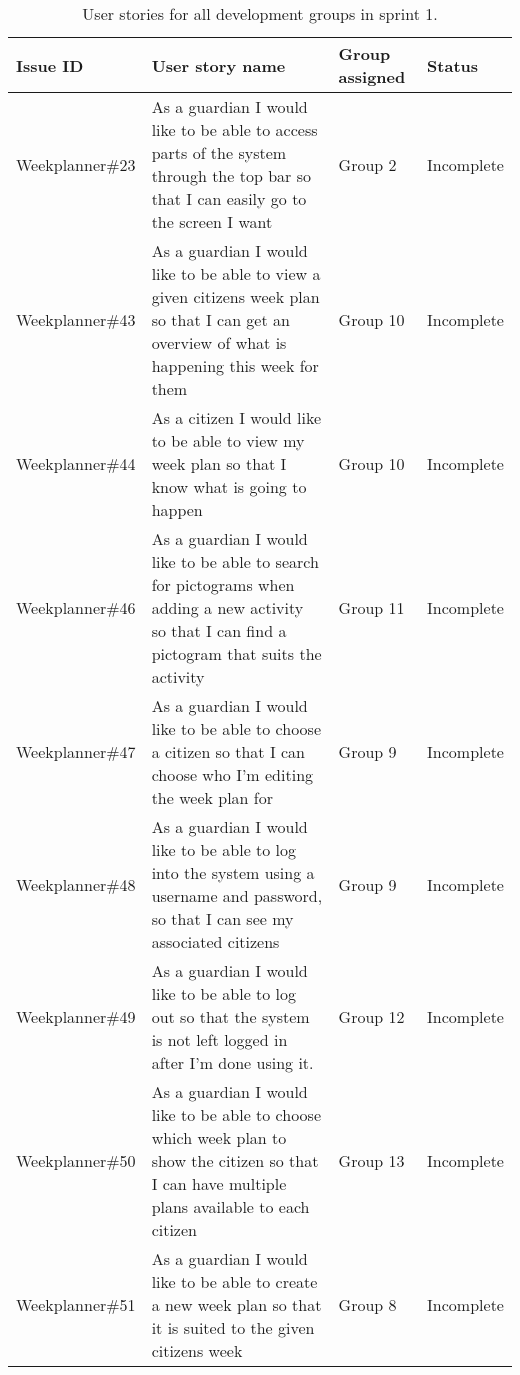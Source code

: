 \begin{table}[H]
    \begin{tabular}{|p{2.8cm}|p{7cm}|p{2cm}|p{2cm}|}
    \hline
    Issue ID        & User story name                                                                                                                                                          & Group assigned  & Status     \\ \hline
    Weekplanner\#23 & As a guardian I would like to be able to access parts of the system through the top bar so that I can easily go to the screen I want                                     & Group 2         & Incomplete  \\ \hline
    Weekplanner\#43 & As a guardian I would like to be able to view a given citizens week plan so that I can get an overview of what is happening this week for them                           & Group 10        & Incomplete     \\ \hline
    Weekplanner\#44 & As a citizen I would like to be able to view my week plan so that I know what is going to happen                                                                         & Group 10        & Incomplete       \\ \hline
    Weekplanner\#46 & As a guardian I would like to be able to search for pictograms when adding a new activity so that I can find a pictogram that suits the activity                         & Group 11        & Incomplete      \\ \hline
    Weekplanner\#47 & As a guardian I would like to be able to choose a citizen so that I can choose who I’m editing the week plan for                                                         & Group 9         & Incomplete    \\ \hline
    Weekplanner\#48 & As a guardian I would like to be able to log into the system using a username and password, so that I can see my associated citizens                                     & Group 9         & Incomplete    \\ \hline
    Weekplanner\#49 & As a guardian I would like to be able to log out so that the system is not left logged in after I’m done using it.                                                       & Group 12        & Incomplete      \\ \hline
    Weekplanner\#50 & As a guardian I would like to be able to choose which week plan to show the citizen so that I can have multiple plans available to each citizen                          & Group 13        & Incomplete     \\ \hline
    Weekplanner\#51 & As a guardian I would like to be able to create a new week plan so that it is suited to the given citizens week                                                          & Group 8         & Incomplete    \\ \hline
   \end{tabular}
   \caption{User stories for all development groups in sprint 1.}\label{table:user-stories-sprint-1-review}
\end{table}

